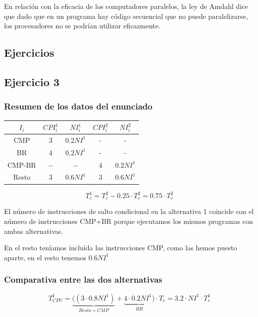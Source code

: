 \documentclass[10pt,a4paper,spanish]{report}
\begin{document}


En relación con la eficacia de los computadores paralelos, la ley de Amdahl dice que dado que en un programa hay código secuencial que no puede paralelizarse, los procesadores no se podrían utilizar eficazmente.

\textcolor[rgb]{0.2,0.4,0.8}{\section{Ejercicios}}
\textcolor[rgb]{0.2,0.4,0.8}{\subsection{Ejercicio 3}}
\textcolor[rgb]{0.2,0.4,0.8}{\subsubsection{Resumen de los datos del enunciado}}
\begin{tabular}{c||c|c||c|c}
$I_i$ & $CPI_i^1$ & $NI_i^1$ & $CPI_i^2$ & $NI_i^2$ \\
\hline
CMP & $3$ & $0.2NI^1$ & - & - \\
BR & $4$ & $0.2NI^1$ & - & - \\
CMP-BR & $-$ & $-$ & $4$ & $0.2NI^1$ \\
Resto & $3$ & $0.6NI^1$ & $3$ & $0.6NI^1$
\end{tabular}

\begin{displaymath}
T_c^1 = T_c^2 - 0.25 \cdot T_c^2 = 0.75 \cdot T_c^2
\end{displaymath}

El número de instrucciones de salto condicional en la alternativa 1 coincide con el número de instrucciones CMP+BR porque ejecutamos los mismos programas con ambas alternativas.

En el resto teníamos incluída las instrucciones CMP, como las hemos puesto aparte, en el resto tenemos $0.6NI^1$

\textcolor[rgb]{0.2,0.4,0.8}{\subsubsection{Comparativa entre las dos alternativas}}
\begin{displaymath}
T_{CPU}^1 = \underbrace{((3 \cdot 0.8NI^1)}_{Resto+CMP} + \underbrace{4 \cdot 0.2NI^1)}_{BR} \cdot T_c = 3.2 \cdot NI^1 \cdot T_c^1
\end{displaymath}
\end{document}
